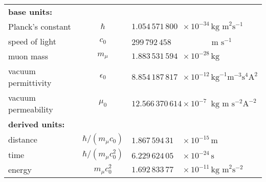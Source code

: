 \begin{table*}[h]
\caption*{Overview of the SI-values of the base units and important derived units for the muonic natural units. SI Values for $\hbar$, $c$, $m_\mu$, $\epsilon_0$, $\mu_0$ are taken from~\cite{codata}.}
\centering\setcellgapes{4pt}\makegapedcells
\begin{tabular}{lc|ll}
\\
{\bf base units:}\\
Planck's constant &$\hbar$ & \multicolumn{2}{l}{$1.054\,571\,800 \phantom{1}\times 10^{-34} \,\text{kg m}^2 \text{s}^{-1}$} \\
speed of light &$c_0$ & \multicolumn{2}{l}{$299\,792\,458\phantom{1} \,\,\phantom{\times 1001 ^{-34}} \text{m s}^{-1}$}\\
muon mass &$m_\mu$ & \multicolumn{2}{l}{$1.883\,531\,594\phantom{1} \times 10^{-28} \,\text{kg}$}\\
vacuum permittivity &$\epsilon_0$ & \multicolumn{2}{l}{$8.854\,187\,817\phantom{1} \times 10^{-12} \,  \text{kg}^{-1} \text{m}^{-3}\text{s}^4\text{A}^2$}\\
vacuum permeability &$\mu_0$ & \multicolumn{2}{l}{$12.566\,370\,614 \times 10^{-7\phantom{1}} \,\text{kg m} \text{ s}^{-2}\text{A}^{-2}$}\\[15pt]
{\bf derived units:}\\
distance & $\hbar/(m_\mu c_0)$ & $1.867\,594\,31\phantom{11}\times 10^{-15}\,\text{m}$\\
time & $\hbar /(m_\mu c_0^2)$ & $6.229\,624\,05\phantom{11}\times 10^{-24}\,\text{s}$\\
energy & $m_\mu c_0^2$ & $1.692\,833\,77\phantom{11}\times 10^{-11}\,\text{kg m}^2\text{s}^{-2}$\\
\end{tabular}
\end{table*}




































